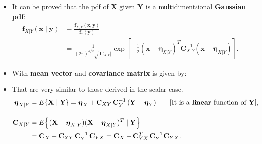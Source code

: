 \begin{itemize}
\begin{align*}
 \right\} = E\!\left\{
   \begin{bmatrix} X-\eta_X \\[2pt] Y-\eta_Y \end{bmatrix}
   \bigl[(X-\eta_X)^{T}\ (Y-\eta_Y)^{T}\bigr]
 \right\} \\[6pt]
&= E\!\left\{
   \begin{bmatrix}
     (X-\eta_X)(X-\eta_X)^{T} & (X-\eta_X)(Y-\eta_Y)^{T} \\
     (Y-\eta_Y)(X-\eta_X)^{T} & (Y-\eta_Y)(Y-\eta_Y)^{T}
   \end{bmatrix}
 \right\} =
\begin{bmatrix}
  C_X  & C_{XY} \\
  C_{YX} & C_Y
\end{bmatrix},
\end{align*}
where
\[
C_{XY} \triangleq E\!\left\{(X-\eta_X)(Y-\eta_Y)^{T}\right\},
\qquad
C_{YX} = C_{XY}^{T}.
\]

\[
f_Z(z) \equiv f_{X,Y}(x,y)
 = \frac{1}{(2\pi)^{\frac{k+l}{2}}\sqrt{|C_Z|}}
   \exp\!\left[
     -\frac{1}{2}
     \begin{bmatrix} x-\eta_X \\ y-\eta_Y \end{bmatrix}^{T}
     C_Z^{-1}
     \begin{bmatrix} x-\eta_X \\ y-\eta_Y \end{bmatrix}
   \right].
\]

    \item It can be proved that the pdf of \textbf{X} given \textbf{Y} is a multidimentsional \textbf{Gaussian pdf}:
    \begin{align*}
\mathbf{f}_{X|Y}(\mathbf{x}\mid\mathbf{y})
&= \frac{\mathbf{f}_{X,Y}(\mathbf{x},\mathbf{y})}{\mathbf{f}_Y(\mathbf{y})} \\[4pt]
&= \frac{1}{(2\pi)^{k/2}\sqrt{\lvert \mathbf{C}_{X|Y}\rvert}}
   \exp\!\left[
     -\frac{1}{2}
     (\mathbf{x}-\boldsymbol{\eta}_{X|Y})^{T}
     \mathbf{C}_{X|Y}^{-1}
     (\mathbf{x}-\boldsymbol{\eta}_{X|Y})
   \right].
\end{align*}
\item With \textbf{mean vector} and \textbf{covariance matrix} is given by:

\item That are very similar to those derived in the scalar case.
\begin{align*}
\boldsymbol{\eta}_{X|Y}
&= E\{\mathbf{X}\mid\mathbf{Y}\}
 = \boldsymbol{\eta}_X
   + \mathbf{C}_{XY}\,\mathbf{C}_Y^{-1}\,(\mathbf{Y}-\boldsymbol{\eta}_Y)
 \qquad\text{[It is a \textbf{linear} function of }\mathbf{Y}\text{]}, \\[10pt]
\mathbf{C}_{X|Y}
&= E\!\left\{(\mathbf{X}-\boldsymbol{\eta}_{X|Y})
            (\mathbf{X}-\boldsymbol{\eta}_{X|Y})^{T}\mid\mathbf{Y}\right\} \\
&= \mathbf{C}_X - \mathbf{C}_{XY}\,\mathbf{C}_Y^{-1}\,\mathbf{C}_{YX}
 = \mathbf{C}_X - \mathbf{C}_{YX}^{T}\,\mathbf{C}_Y^{-1}\,\mathbf{C}_{YX}.
\end{align*}


\end{itemize}
